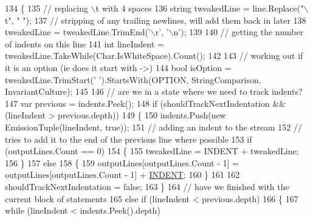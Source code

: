 \begin{DoxyCode}
134                 \{
135                     \textcolor{comment}{// replacing \(\backslash\)t with 4 spaces}
136                     \textcolor{keywordtype}{string} tweakedLine = line.Replace(\textcolor{stringliteral}{"\(\backslash\)t"}, \textcolor{stringliteral}{"    "});
137                     \textcolor{comment}{// stripping of any trailing newlines, will add them back in later}
138                     tweakedLine = tweakedLine.TrimEnd(\textcolor{charliteral}{'\(\backslash\)r'}, \textcolor{charliteral}{'\(\backslash\)n'});
139 
140                     \textcolor{comment}{// getting the number of indents on this line}
141                     \textcolor{keywordtype}{int} lineIndent = tweakedLine.TakeWhile(Char.IsWhiteSpace).Count();
142 
143                     \textcolor{comment}{// working out if it is an option (ie does it start with ->)}
144                     \textcolor{keywordtype}{bool} isOption = tweakedLine.TrimStart(\textcolor{charliteral}{' '}).StartsWith(OPTION, StringComparison.
      InvariantCulture);
145 
146                     \textcolor{comment}{// are we in a state where we need to track indents?}
147                     var previous = indents.Peek();
148                     \textcolor{keywordflow}{if} (shouldTrackNextIndentation && (lineIndent > previous.depth))
149                     \{
150                         indents.Push(\textcolor{keyword}{new} EmissionTuple(lineIndent, \textcolor{keyword}{true}));
151                         \textcolor{comment}{// adding an indent to the stream}
152                         \textcolor{comment}{// tries to add it to the end of the previous line where possible}
153                         \textcolor{keywordflow}{if} (outputLines.Count == 0)
154                         \{
155                             tweakedLine = INDENT + tweakedLine;
156                         \}
157                         \textcolor{keywordflow}{else}
158                         \{
159                             outputLines[outputLines.Count - 1] = outputLines[outputLines.Count - 1] + 
      \hyperlink{a00351_ae3f2190a793ab77428838e58e0e83676}{INDENT};
160                         \}
161 
162                         shouldTrackNextIndentation = \textcolor{keyword}{false};
163                     \}
164                     \textcolor{comment}{// have we finished with the current block of statements}
165                     \textcolor{keywordflow}{else} \textcolor{keywordflow}{if} (lineIndent < previous.depth)
166                     \{
167                         \textcolor{keywordflow}{while} (lineIndent < indents.Peek().depth)

\end{DoxyCode}
